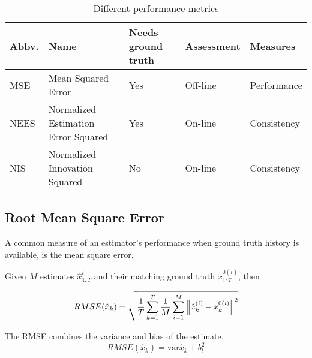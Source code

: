 

\begin{table}[H]
	\centering
	\caption{Different performance metrics}
	\label{tab:sensor_active}
	\begin{tabular}{lllll}
		\hline
		Abbv. & Name                                & Needs ground truth & Assessment   & Measures    \\ \hline
		MSE   & Mean Squared Error                  & Yes                & Off-line & Performance \\
		NEES  & Normalized Estimation Error Squared & Yes                & On-line     & Consistency \\
		NIS   & Normalized Innovation Squared       & No                 & On-line     & Consistency \\ \hline
	\end{tabular}
\end{table}

\subsection{Root Mean Square Error} \label{ssec:RMSE}
A common measure of an estimator's performance when ground truth history is available, is the  mean square error. 
\begin{framed}
Given $M$ estimates $\hat{x}^{i}_{1:T}$ and their matching ground truth $x^{0(i)}_{1:T}$, then

\begin{equation}\label{RMSE}
	RMSE(\hat{x}_k) = \sqrt{\frac{1}{T}\sum_{k=1}^{T}\frac{1}{M} \sum_{i=1}^{M} \left\lVert {\hat{x}_k^{(i)} - x_k^{0(i)}}\right\rVert^2}
\end{equation}
\end{framed}
The RMSE combines the variance and bias of the estimate,
\begin{equation}\label{key}
RMSE(\hat{x}_k)  = \text{var} \hat{x}_k + b_t^2
\end{equation}

